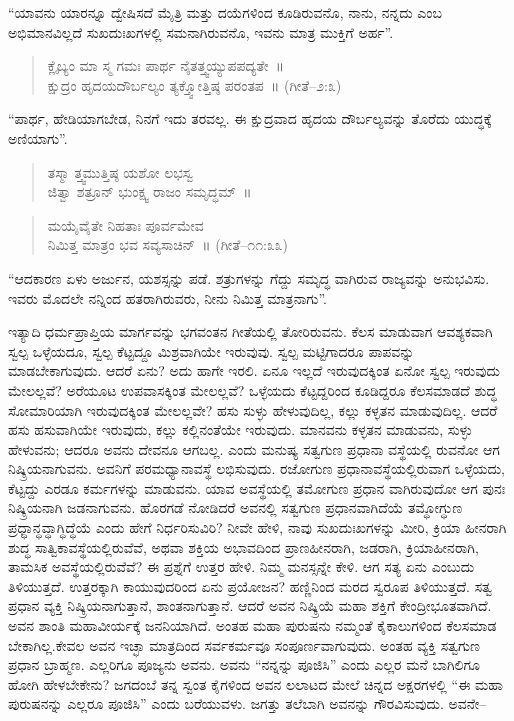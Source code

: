 “ಯಾವನು ಯಾರನ್ನೂ ದ್ವೇಷಿಸದೆ ಮೈತ್ರಿ ಮತ್ತು ದಯೆಗಳಿಂದ ಕೂಡಿರುವನೊ, ನಾನು, ನನ್ನದು ಎಂಬ ಅಭಿಮಾನವಿಲ್ಲದೆ ಸುಖದುಃಖಗಳಲ್ಲಿ ಸಮನಾಗಿರುವನೊ, ಇವನು ಮಾತ್ರ ಮುಕ್ತಿಗೆ ಅರ್ಹ”.

\begin{verse}
ಕ್ಲೈಬ್ಯಂ ಮಾ ಸ್ಮ ಗಮಃ ಪಾರ್ಥ ನೈತತ್ತ್ವಯ್ಯುಪಪದ್ಯತೇ~॥\\ಕ್ಷುದ್ರಂ ಹೃದಯದೌರ್ಬಲ್ಯಂ ತ್ಯಕ್ತ್ವೋತ್ತಿಷ್ಠ ಪರಂತಪ~॥ (ಗೀತೆ–೨:೩)
\end{verse}

“ಪಾರ್ಥ, ಹೇಡಿಯಾಗಬೇಡ, ನಿನಗೆ ಇದು ತರವಲ್ಲ. ಈ ಕ್ಷುದ್ರವಾದ ಹೃದಯ ದೌರ್ಬಲ್ಯವನ್ನು ತೊರೆದು ಯುದ್ಧಕ್ಕೆ ಅಣಿಯಾಗು”.

\begin{verse}
ತಸ್ಮಾ ತ್ತ್ವಮುತ್ತಿಷ್ಠ ಯಶೋ ಲಭಸ್ವ\\ಜಿತ್ವಾ ಶತ್ರೂನ್​ ಭುಂಕ್ಷ್ವ ರಾಜಂ ಸಮೃದ್ಧಮ್​~॥
\end{verse}

\begin{verse}
ಮಯೈವೈತೇ ನಿಹತಾಃ ಪೂರ್ವಮೇವ\\ನಿಮಿತ್ತ ಮಾತ್ರಂ ಭವ ಸವ್ಯಸಾಚಿನ್​~॥ (ಗೀತೆ–೧೧:೩೩)
\end{verse}

“ಆದಕಾರಣ ಏಳು ಅರ್ಜುನ, ಯಶಸ್ಸನ್ನು ಪಡೆ. ಶತ್ರುಗಳನ್ನು ಗೆದ್ದು ಸಮೃದ್ಧ ವಾಗಿರುವ ರಾಜ್ಯವನ್ನು ಅನುಭವಿಸು. ಇವರು ಮೊದಲೇ ನನ್ನಿಂದ ಹತರಾಗಿರುವರು, ನೀನು ನಿಮಿತ್ತ ಮಾತ್ರನಾಗು”.

ಇತ್ಯಾದಿ ಧರ್ಮಪ್ರಾಪ್ತಿಯ ಮಾರ್ಗವನ್ನು ಭಗವಂತನ ಗೀತೆಯಲ್ಲಿ ತೋರಿರುವನು. ಕೆಲಸ ಮಾಡುವಾಗ ಆವಶ್ಯಕವಾಗಿ ಸ್ವಲ್ಪ ಒಳ್ಳೆಯದೂ, ಸ್ವಲ್ಪ ಕೆಟ್ಟದ್ದೂ ಮಿಶ್ರವಾಗಿಯೇ ಇರುವುವು. ಸ್ವಲ್ಪ ಮಟ್ಟಿಗಾದರೂ ಪಾಪವನ್ನು ಮಾಡಬೇಕಾಗುವುದು. ಆದರೆ ಏನು? ಅದು ಹಾಗೇ ಇರಲಿ. ಏನೂ ಇಲ್ಲದೆ ಇರುವುದಕ್ಕಿಂತ ಏನೋ ಸ್ವಲ್ಪ ಇರುವುದು ಮೇಲಲ್ಲವೆ? ಅರೆಯೂಟ ಉಪವಾಸಕ್ಕಿಂತ ಮೇಲಲ್ಲವೆ? ಒಳ್ಳೆಯದು ಕೆಟ್ಟದ್ದರಿಂದ ಕೂಡಿದ್ದರೂ ಕೆಲಸ\-ಮಾಡದೆ ಶುದ್ಧ ಸೋಮಾರಿಯಾಗಿ ಇರುವುದಕ್ಕಿಂತ ಮೇಲಲ್ಲವೇ? ಹಸು ಸುಳ್ಳು ಹೇಳುವುದಿಲ್ಲ, ಕಲ್ಲು ಕಳ್ಳತನ ಮಾಡುವುದಿಲ್ಲ. ಆದರೆ ಹಸು ಹಸುವಾಗಿಯೇ ಇರುವುದು, ಕಲ್ಲು ಕಲ್ಲಿನಂತೆಯೇ ಇರುವುದು. ಮಾನವನು ಕಳ್ಳತನ ಮಾಡುವನು, ಸುಳ್ಳು ಹೇಳುವನು; ಆದರೂ ಅವನು ದೇವನೂ ಆಗಬಲ್ಲ. ಎಂದು ಮನುಷ್ಯ ಸತ್ವಗುಣ ಪ್ರಧಾನಾ ವಸ್ಥೆಯಲ್ಲಿ ರುವನೋ ಆಗ ನಿಷ್ಕ್ರಿಯನಾಗುವನು. ಅವನಿಗೆ ಪರಮಧ್ಯಾನಾವಸ್ಥೆ ಲಭಿಸುವುದು. ರಜೋಗುಣ ಪ್ರಧಾನಾವಸ್ಥೆಯಲ್ಲಿರುವಾಗ ಒಳ್ಳೆಯದು, ಕೆಟ್ಟದ್ದು ಎರಡೂ ಕರ್ಮಗಳನ್ನು ಮಾಡುವನು. ಯಾವ ಅವಸ್ಥೆಯಲ್ಲಿ ತಮೋಗುಣ ಪ್ರಧಾನ ವಾಗಿರುವುದೋ ಆಗ ಪುನಃ ನಿಷ್ಕ್ರಿಯನಾಗಿ ಜಡನಾಗುವನು. ಹೊರಗಡೆ ನೋಡಿದರೆ ಅವನಲ್ಲಿ ಸತ್ವಗುಣ ಪ್ರಧಾನವಾಗಿದೆಯೆ ತಮ್ಧೋಗ್ಧುಣ ಪ್ರಧ್ಧಾನ್ಧವ್ಧಾಗ್ಧಿದ್ಧೆಯೆ ಎಂದು ಹೇಗೆ ನಿರ್ಧರಿಸುವಿರಿ? ನೀವೇ ಹೇಳಿ, ನಾವು ಸುಖದುಃಖಗಳನ್ನು ಮೀರಿ, ಕ್ರಿಯಾ ಹೀನರಾಗಿ ಶುದ್ಧ ಸಾತ್ವಿಕಾವಸ್ಥೆ\-ಯಲ್ಲಿರುವೆವೆ, ಅಥವಾ ಶಕ್ತಿಯ ಅಭಾವದಿಂದ ಪ್ರಾಣಹೀನರಾಗಿ, ಜಡರಾಗಿ, ಕ್ರಿಯಾಹೀನ\-ರಾಗಿ, ತಾಮಸಿಕ ಅವಸ್ಥೆಯಲ್ಲಿರುವೆವೆ? ಈ ಪ್ರಶ್ನೆಗೆ ಉತ್ತರ ಹೇಳಿ. ನಿಮ್ಮ ಮನಸ್ಸನ್ನೇ ಕೇಳಿ. ಆಗ ಸತ್ಯ ಏನು ಎಂಬುದು ತಿಳಿಯುತ್ತದೆ. ಉತ್ತರಕ್ಕಾಗಿ ಕಾಯುವುದರಿಂದ ಏನು ಪ್ರಯೋಜನ? ಹಣ್ಣಿನಿಂದ ಮರದ ಸ್ವರೂಪ ತಿಳಿಯುತ್ತದೆ. ಸತ್ವ ಪ್ರಧಾನ ವ್ಯಕ್ತಿ ನಿಷ್ಕ್ರಿಯನಾಗುತ್ತಾನೆ, ಶಾಂತನಾಗುತ್ತಾನೆ. ಆದರೆ ಅವನ ನಿಷ್ಕ್ರಿಯೆ ಮಹಾ ಶಕ್ತಿಗೆ ಕೇಂದ್ರೀಭೂತ\-ವಾಗಿದೆ. ಅವನ ಶಾಂತಿ ಮಹಾವೀರ್ಯಕ್ಕೆ ಜನನಿಯಾಗಿದೆ. ಅಂತಹ ಮಹಾ ಪುರುಷನು ನಮ್ಮಂತೆ ಕೈಕಾಲುಗಳಿಂದ ಕೆಲಸಮಾಡ ಬೇಕಾಗಿಲ್ಲ.ಕೇವಲ ಅವನ ಇಚ್ಛಾ ಮಾತ್ರದಿಂದ ಸರ್ವಕರ್ಮವೂ ಸಂಪೂರ್ಣವಾಗುವುದು. ಅಂತಹ ವ್ಯಕ್ತಿ ಸತ್ವಗುಣ ಪ್ರಧಾನ ಬ್ರಾಹ್ಮಣ. ಎಲ್ಲರಿಗೂ ಪೂಜ್ಯನು ಅವನು. ಅವನು “ನನ್ನನ್ನು ಪೂಜಿಸಿ” ಎಂದು ಎಲ್ಲರ ಮನೆ ಬಾಗಿಲಿಗೂ ಹೋಗಿ ಹೇಳಬೇಕೇನು? ಜಗದಂಬೆ ತನ್ನ ಸ್ವಂತ ಕೈಗಳಿಂದ ಅವನ ಲಲಾಟದ ಮೇಲೆ ಚಿನ್ನದ ಅಕ್ಷರಗಳಲ್ಲಿ “ಈ ಮಹಾ ಪುರುಷನನ್ನು ಎಲ್ಲರೂ ಪೂಜಿಸಿ” ಎಂದು ಬರೆಯುವಳು. ಜಗತ್ತು ತಲೆಬಾಗಿ ಅವನನ್ನು ಗೌರವಿಸುವುದು. ಅವನೇ–

